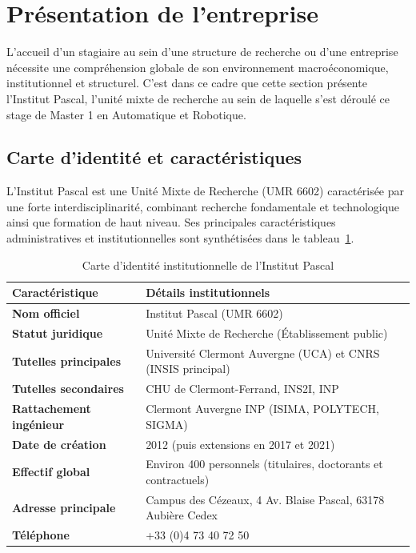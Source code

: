 \documentclass[12pt,a4paper,oneside]{report}
\begin{document}
\section{Présentation de l'entreprise}
L'accueil d'un stagiaire au sein d'une structure de recherche ou d'une entreprise nécessite une compréhension globale de son environnement macroéconomique, institutionnel et structurel. C'est dans ce cadre que cette section présente l'Institut Pascal, l'unité mixte de recherche au sein de laquelle s'est déroulé ce stage de Master 1 en Automatique et Robotique.

\subsection{Carte d'identité et caractéristiques}
L'Institut Pascal est une Unité Mixte de Recherche (UMR 6602) caractérisée par une forte interdisciplinarité, combinant recherche fondamentale et technologique ainsi que formation de haut niveau. Ses principales caractéristiques administratives et institutionnelles sont synthétisées dans le tableau~\ref{tab:carte_identite}.

\begin{table}[htbp]
    \centering
    \small
    \renewcommand{\arraystretch}{1.3}
    \begin{tabular}{|l|l|}
        \hline
        \textbf{Caractéristique} & \textbf{Détails institutionnels} \\
        \hline
        \textbf{Nom officiel} & Institut Pascal (UMR 6602) \\
        \hline
        \textbf{Statut juridique} & Unité Mixte de Recherche (Établissement public) \\
        \hline
        \textbf{Tutelles principales} & Université Clermont Auvergne (UCA) et CNRS (INSIS principal) \\
        \hline
        \textbf{Tutelles secondaires} & CHU de Clermont-Ferrand, INS2I, INP \\
        \hline
        \textbf{Rattachement ingénieur} & Clermont Auvergne INP (ISIMA, POLYTECH, SIGMA) \\
        \hline
        \textbf{Date de création} & 2012 (puis extensions en 2017 et 2021) \\
        \hline
        \textbf{Effectif global} & Environ 400 personnels (titulaires, doctorants et contractuels) \\
        \hline
        \textbf{Adresse principale} & Campus des Cézeaux, 4 Av. Blaise Pascal, 63178 Aubière Cedex \\
        \hline
        \textbf{Téléphone} & +33 (0)4 73 40 72 50 \\
        \hline
    \end{tabular}
    \caption{Carte d'identité institutionnelle de l'Institut Pascal}
    \label{tab:carte_identite}
\end{table}
\end{document}
